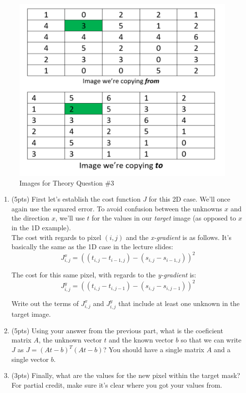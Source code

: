 \documentclass[12pt]{article}
\begin{document}
\begin{enumerate}
\begin{figure}[H]
\begin{center}
\includegraphics{masks.png}
\caption{Images for Theory Question \#3}
\label{masks}
\end{center}
\end{figure}

\begin{enumerate}
\item (5pts) First let's establish the cost function $J$ for this 2D case.  We'll once again use the squared error.  To avoid confusion between the unknowns $x$ and the direction $x$, we'll use $t$ for the values in our \emph{target} image (as opposed to $x$ in the 1D example).\\

\noindent
The cost with regards to pixel $(i,j)$ and the \emph{x-gradient} is as follows.  It's basically the same as the 1D case in the lecture slides:
$$J_{i,j}^x = ((t_{i,j} - t_{i-1,j})  - (s_{i,j} - s_{i-1,j}))^2$$

The cost for this same pixel, with regards to the \emph{y-gradient} is:
$$J_{i,j}^y = ((t_{i,j} - t_{i,j-1}) - (s_{i,j} - s_{i,j-1}))^2$$

Write out the terms of $J^x_{i,j}$ and $J^y_{i,j}$ that include at least one unknown in the target image.\\

\item (5pts) Using your answer from the previous part, what is the coeficient matrix $A$, the unknown vector $t$ and the known vector $b$ so that we can write $J$ as $J=(At-b)^T(At-b)$?  You should have a single matrix $A$ and a single vector $b$.\\

\item (3pts)  Finally, what are the values for the new pixel within the target mask?  For partial credit, make sure it's clear where you got your values from.\\
\end{enumerate}
\end{enumerate}
\end{document}
